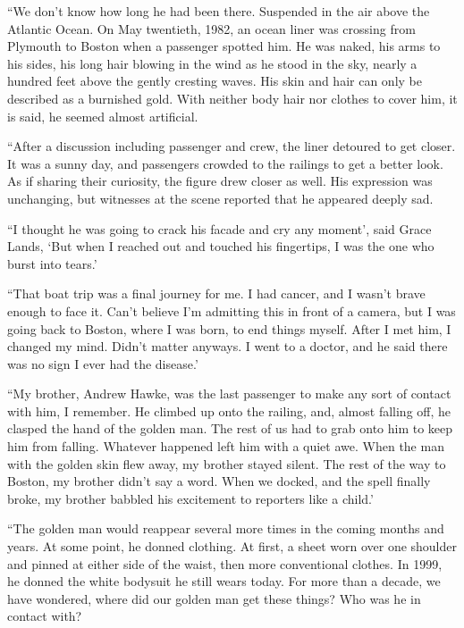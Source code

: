 





``We don't know how long he had been there.  Suspended in the air above the Atlantic Ocean.  On May twentieth, 1982, an ocean liner was crossing from Plymouth to Boston when a passenger spotted him.  He was naked, his arms to his sides, his long hair blowing in the wind as he stood in the sky, nearly a hundred feet above the gently cresting waves.  His skin and hair can only be described as a burnished gold.  With neither body hair nor clothes to cover him, it is said, he seemed almost artificial.



``After a discussion including passenger and crew, the liner detoured to get closer.  It was a sunny day, and passengers crowded to the railings to get a better look.  As if sharing their curiosity, the figure drew closer as well.  His expression was unchanging, but witnesses at the scene reported that he appeared deeply sad.



``I thought he was going to crack his facade and cry any moment', said Grace Lands, `But when I reached out and touched his fingertips, I was the one who burst into tears.'



``That boat trip was a final journey for me.  I had cancer, and I wasn't brave enough to face it.  Can't believe I'm admitting this in front of a camera, but I was going back to Boston, where I was born, to end things myself.  After I met him, I changed my mind.  Didn't matter anyways.  I went to a doctor, and he said there was no sign I ever had the disease.'



``My brother, Andrew Hawke, was the last passenger to make any sort of contact with him, I remember.  He climbed up onto the railing, and, almost falling off, he clasped the hand of the golden man.  The rest of us had to grab onto him to keep him from falling.  Whatever happened left him with a quiet awe.  When the man with the golden skin flew away, my brother stayed silent.  The rest of the way to Boston, my brother didn't say a word.  When we docked, and the spell finally broke, my brother babbled his excitement to reporters like a child.'



``The golden man would reappear several more times in the coming months and years.  At some point, he donned clothing.  At first, a sheet worn over one shoulder and pinned at either side of the waist, then more conventional clothes.  In 1999, he donned the white bodysuit he still wears today.  For more than a decade, we have wondered, where did our golden man get these things?  Who was he in contact with?



